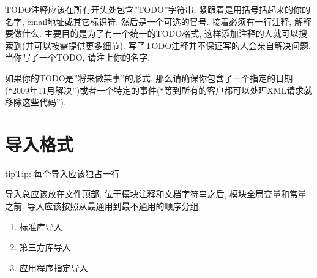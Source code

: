 \documentclass[a4paper,10pt,english]{sphinxmanual}
\begin{document}
TODO注释应该在所有开头处包含”TODO”字符串, 紧跟着是用括号括起来的你的名字, email地址或其它标识符. 然后是一个可选的冒号. 接着必须有一行注释, 解释要做什么. 主要目的是为了有一个统一的TODO格式, 这样添加注释的人就可以搜索到(并可以按需提供更多细节). 写了TODO注释并不保证写的人会亲自解决问题. 当你写了一个TODO, 请注上你的名字.

%
\begin{sphinxVerbatim}[commandchars=\\\{\}]
\end{sphinxVerbatim}

如果你的TODO是”将来做某事”的形式, 那么请确保你包含了一个指定的日期(“2009年11月解决”)或者一个特定的事件(“等到所有的客户都可以处理XML请求就移除这些代码”).


\section{导入格式}
\label{\detokenize{python_style_rules:id13}}
\begin{sphinxadmonition}{tip}{Tip:}
每个导入应该独占一行
\end{sphinxadmonition}

%
\begin{sphinxVerbatim}[commandchars=\\\{\}]
  
      
\end{sphinxVerbatim}

%
\begin{sphinxVerbatim}[commandchars=\\\{\}]
    
\end{sphinxVerbatim}

导入总应该放在文件顶部, 位于模块注释和文档字符串之后, 模块全局变量和常量之前.  导入应该按照从最通用到最不通用的顺序分组:
\begin{enumerate}
\item {} 
标准库导入

\item {} 
第三方库导入

\item {} 
应用程序指定导入

\end{enumerate}
\end{document}
